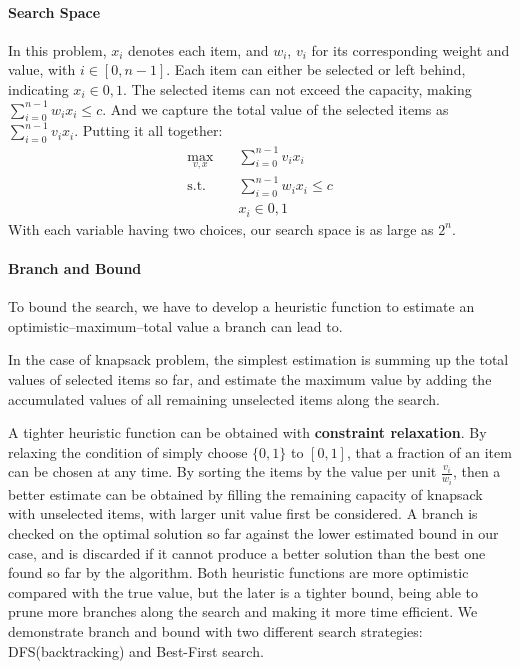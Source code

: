 \documentclass[../main.tex]{subfiles}
\begin{document}
\paragraph{Search Space} In this problem, $x_i$ denotes each item, and $w_i$, $v_i$ for its corresponding weight and value, with $i\in[0, n-1]$. Each item can either be selected or left behind, indicating $x_i\in{0, 1}$. The selected items can not exceed the capacity, making $\sum_{i=0}^{n-1} w_i x_i \leq c$. And we capture the total value of the selected items as $\sum_{i=0}^{n-1} v_i x_i$.  Putting it all together:
\begin{align}
    \max_{v, x} \quad & \sum_{i=0}^{n-1} v_i x_i\\
    \textrm{s.t.} \quad  & \sum_{i=0}^{n-1} w_i x_i \leq c\\
    & x_i\in{0, 1}
\end{align}
With each variable having two choices, our search space is as large as $2^n$.

\paragraph{Branch and Bound} 

To bound the search, we have to develop a heuristic function to estimate an optimistic--maximum--total value a branch can lead to. 

In the case of knapsack problem, the simplest estimation is summing up the total values of selected items so far, and estimate the maximum value by adding the accumulated values of all remaining unselected items along the search. 


A tighter heuristic function can be obtained with \textbf{constraint relaxation}. By relaxing the condition of simply choose $\{0, 1\}$ to $[0, 1]$, that a fraction of an item can be chosen at any time. By sorting the items by the value per unit $\frac{v_i}{w_i}$, then a better estimate can be obtained by filling the remaining capacity of knapsack with unselected items, with larger unit value first be considered. A branch is checked on the optimal solution so far against the lower estimated bound in our case, and is discarded if it cannot produce a better solution than the best one found so far by the algorithm. Both heuristic functions are more optimistic compared with the true value, but the later is a tighter bound, being able to prune more branches along the search and making it more time efficient. We demonstrate branch and bound with two different search strategies: DFS(backtracking) and Best-First search.
\end{document}
